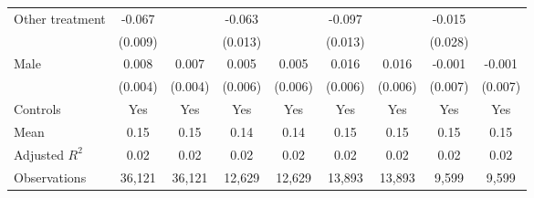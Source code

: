 {\begin{tabular}{l*{8}{c}}
Other treatment     &      -0.067\sym{***}&                     &      -0.063\sym{***}&                     &      -0.097\sym{***}&                     &      -0.015         &                     \\
                    &     (0.009)         &                     &     (0.013)         &                     &     (0.013)         &                     &     (0.028)         &                     \\
Male                &       0.008\sym{**} &       0.007\sym{**} &       0.005         &       0.005         &       0.016\sym{***}&       0.016\sym{***}&      -0.001         &      -0.001         \\
                    &     (0.004)         &     (0.004)         &     (0.006)         &     (0.006)         &     (0.006)         &     (0.006)         &     (0.007)         &     (0.007)         \\
Controls            &         Yes         &         Yes         &         Yes         &         Yes         &         Yes         &         Yes         &         Yes         &         Yes         \\
\hline
Mean                &        0.15         &        0.15         &        0.14         &        0.14         &        0.15         &        0.15         &        0.15         &        0.15         \\
Adjusted \(R^{2}\)  &        0.02         &        0.02         &        0.02         &        0.02         &        0.02         &        0.02         &        0.02         &        0.02         \\
Observations        &      36,121         &      36,121         &      12,629         &      12,629         &      13,893         &      13,893         &       9,599         &       9,599         \\
\hline\hline
\end{tabular}
}
